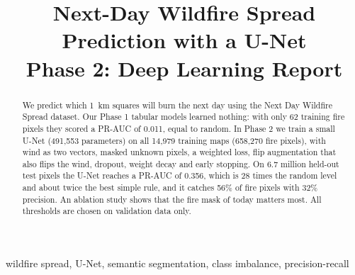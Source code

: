 \documentclass[conference]{IEEEtran}
\begin{document}
\title{Next-Day Wildfire Spread Prediction with a U-Net\\Phase 2: Deep Learning Report}

\author{
}

\maketitle

\begin{abstract}
We predict which 1~km squares will burn the next day using the Next Day Wildfire Spread dataset. Our Phase 1 tabular models learned nothing: with only 62 training fire pixels they scored a PR-AUC of 0.011, equal to random. In Phase 2 we train a small U-Net (491{,}553 parameters) on all 14{,}979 training maps (658{,}270 fire pixels), with wind as two vectors, masked unknown pixels, a weighted loss, flip augmentation that also flips the wind, dropout, weight decay and early stopping. On 6.7 million held-out test pixels the U-Net reaches a PR-AUC of 0.356, which is 28 times the random level and about twice the best simple rule, and it catches 56\% of fire pixels with 32\% precision. An ablation study shows that the fire mask of today matters most. All thresholds are chosen on validation data only.
\end{abstract}

\begin{IEEEkeywords}
wildfire spread, U-Net, semantic segmentation, class imbalance, precision-recall
\end{IEEEkeywords}











\end{document}
